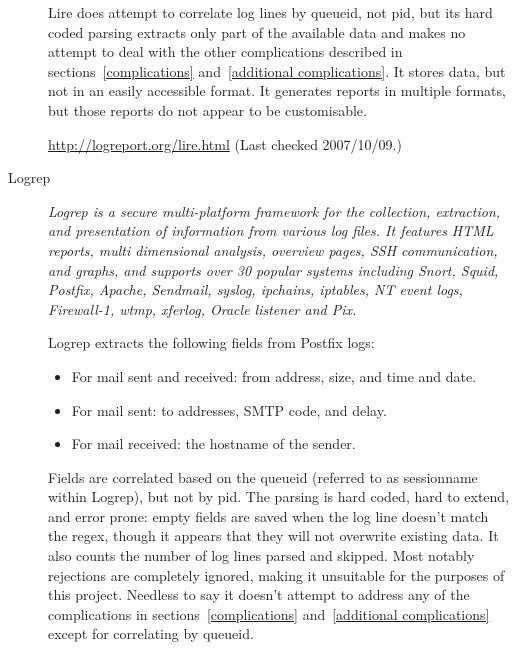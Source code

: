 \documentclass[a4paper,12pt,draft]{article}
\begin{document}
\begin{description}
        Lire does attempt to correlate log lines by queueid, not pid, but
        its hard coded parsing extracts only part of the available data and
        makes no attempt to deal with the other complications described in
        sections~\ref{complications} and~\ref{additional complications}.
        It stores data, but not in an easily accessible format.  It
        generates reports in multiple formats, but those reports do not
        appear to be customisable.
        
        \url{http://logreport.org/lire.html} \newline (Last checked
        2007/10/09.)

    \item [Logrep] \textit{Logrep is a secure multi-platform framework for
        the collection, extraction, and presentation of information from
        various log files. It features HTML reports, multi dimensional
        analysis, overview pages, SSH communication, and graphs, and
        supports over 30 popular systems including Snort, Squid, Postfix,
        Apache, Sendmail, syslog, ipchains, iptables, NT event logs,
        Firewall-1, wtmp, xferlog, Oracle listener and Pix.\/}

        Logrep extracts the following fields from Postfix logs:

        \begin{itemize}

            \item For mail sent and received: from address, size, and
                time and date.

            \item For mail sent: to addresses, SMTP code, and delay.

            \item For mail received: the hostname of the sender.
                
        \end{itemize}
        
        Fields are correlated based on the queueid (referred to as
        sessionname within Logrep), but not by pid.  The parsing is hard
        coded, hard to extend, and error prone: empty fields are saved when
        the log line doesn't match the regex, though it appears that they
        will not overwrite existing data.  It also counts the number of log
        lines parsed and skipped.  Most notably rejections are completely
        ignored, making it unsuitable for the purposes of this project.
        Needless to say it doesn't attempt to address any of the
        complications in sections~\ref{complications} and~\ref{additional
        complications} except for correlating by queueid.


\end{description}
\end{document}

